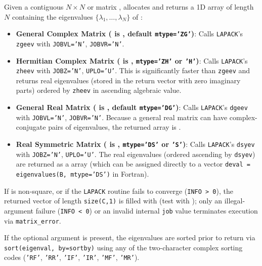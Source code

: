 Given a contiguous $N\times N$  or  matrix ,  allocates and returns a 1D  array  of length $N$ containing the eigenvalues $\{\lambda_1, \ldots, \lambda_N\}$ of :
\begin{itemize}
  \item \textbf{General Complex Matrix ( is , default \texttt{mtype='ZG'})}: Calls \texttt{LAPACK}'s \texttt{zgeev} with \texttt{JOBVL='N'}, \texttt{JOBVR='N'}.
  \item \textbf{Hermitian Complex Matrix ( is , \texttt{mtype='ZH'} or \texttt{'H'})}: Calls \texttt{LAPACK}'s \texttt{zheev} with \texttt{JOBZ='N'}, \texttt{UPLO='U'}. This is significantly faster than \texttt{zgeev} and returns real eigenvalues (stored in the  return vector with zero imaginary parts) ordered by \texttt{zheev} in ascending algebraic value.
  \item \textbf{General Real Matrix ( is , default \texttt{mtype='DG'})}: Calls \texttt{LAPACK}'s \texttt{dgeev} with \texttt{JOBVL='N'}, \texttt{JOBVR='N'}. Because a general real matrix can have complex-conjugate pairs of eigenvalues, the returned array is .
  \item \textbf{Real Symmetric Matrix ( is , \texttt{mtype='DS'} or \texttt{'S'})}: Calls \texttt{LAPACK}'s \texttt{dsyev} with \texttt{JOBZ='N'}, \texttt{UPLO='U'}. The real eigenvalues (ordered ascending by \texttt{dsyev}) are returned as a  array (which can be assigned directly to a  vector \texttt{deval = eigenvalues(B, mtype='DS')} in Fortran).
\end{itemize}
If  is non-square, or if the \texttt{LAPACK} routine fails to converge (\texttt{INFO > 0}), the returned vector of length \texttt{size(C,1)} is filled with  (test with ); only an illegal-argument failure (\texttt{INFO < 0}) or an invalid internal \texttt{job} value terminates execution via \texttt{matrix\_error}.

If the optional argument  is present, the eigenvalues are sorted prior to return via \texttt{sort(eigenval, by=sortby)} using any of the two-character complex sorting codes (\texttt{'RF'}, \texttt{'RR'}, \texttt{'IF'}, \texttt{'IR'}, \texttt{'MF'}, \texttt{'MR'}).

